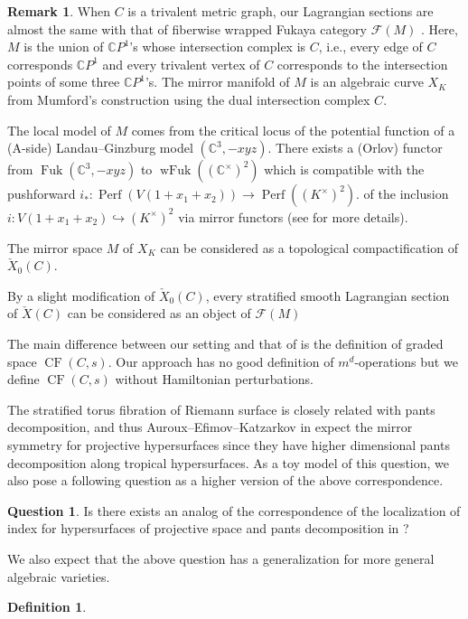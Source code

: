 \documentclass[a4paper,dvipdfmx,reqno,12pt]{amsart}
\theoremstyle{definition}
\newtheorem{Def}[Thm]{Definition}
\newtheorem{Ques}[Thm]{Question}
\newtheorem{Rmk}[Thm]{Remark}
\newcommand{\C}{\mathbb{C}}%
\newcommand{\mcal}[1]{\mathcal{#1}}%
\newcommand{\opn}[1]{\operatorname{#1}}
\newcommand{\hookto}{\hookrightarrow}
\numberwithin{equation}{section}
\begin{document}
\begin{Rmk} \label{rmk: curve_mirror}
When $C$ is a trivalent metric graph, 
our Lagrangian sections are 
almost the same with that of fiberwise wrapped Fukaya category 
$\mcal{F}(M)$ \cite[3.1]{auroux2022lagrangian}.
Here, $M$ is the
union of $\C P^{1}$'s whose intersection complex is $C$, 
i.e., every edge of $C$ corresponds
$\C P^{1}$ and every trivalent vertex of $C$ corresponds
to the intersection points of some three $\C P^{1}$'s.
The mirror manifold of $M$ is an algebraic curve $X_K$
from Mumford's construction using the dual intersection
complex $C$.

The local model of $M$ comes from the critical locus
of the potential function of a (A-side) Landau--Ginzburg 
model $(\C^{3},-xyz)$. There exists a (Orlov) functor
from $\opn{Fuk}(\C^{3},-xyz)$ 
to $\opn{wFuk}((\C^{\times})^2)$ which is compatible
with the pushforward 
$i_*\colon \opn{Perf}(V(1+x_1+x_2))\to \opn{Perf}((K^{\times})^{2})$. 
of the inclusion $i\colon V(1+x_1+x_2)\hookto (K^{\times})^2$
via mirror functors (see \cite[2.]{auroux2022lagrangian}
for more details). 

The mirror space $M$ of $X_K$ can be considered as a 
topological compactification of $\check{X}_0(C)$.

By a slight modification of $\check{X}_0(C)$, every 
stratified smooth Lagrangian section of $\check{X}(C)$ 
can be considered as an object of $\mcal{F}(M)$

The main difference between our setting and 
that of \cite{auroux2022lagrangian} 
is the definition of graded space $\opn{CF}(C,s)$. 
Our approach has no good definition 
of $m^{d}$-operations but we define $\opn{CF}(C,s)$ 
without Hamiltonian
perturbations.
\end{Rmk}

The stratified torus fibration of Riemann surface is 
closely related with pants decomposition, and thus
Auroux--Efimov--Katzarkov in \cite{auroux2022lagrangian} expect the mirror symmetry 
for projective hypersurfaces since they have higher 
dimensional pants decomposition \cite{MR2079993} along
tropical hypersurfaces.
As a toy model of this question, we also pose a 
following question as a higher version of the 
above correspondence.
\begin{Ques}
Is there exists an analog of the correspondence of the 
localization of index for
hypersurfaces of projective space and pants decomposition 
in \cite{MR2079993}?
\end{Ques}
We also expect that the above question has a generalization
for more general algebraic varieties.
\begin{Def} \label{def: weighted_lattice_points}

\end{Def}
\end{document}
